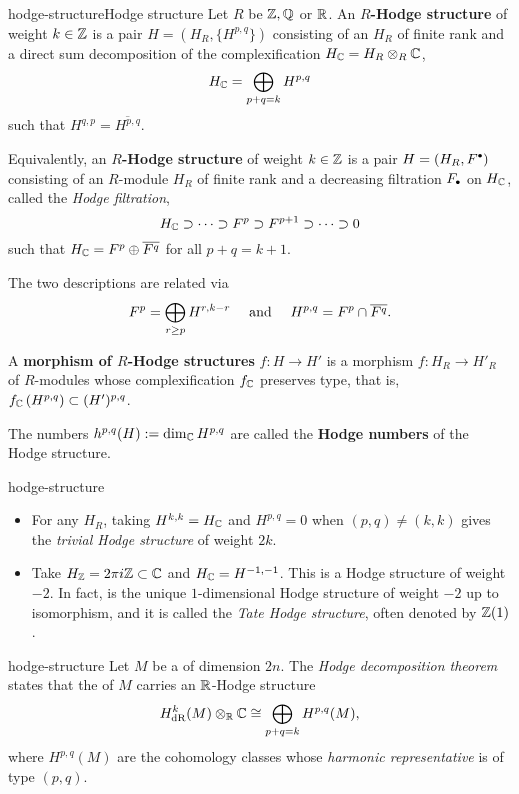 \begin{topic}{hodge-structure}{Hodge structure}
    Let $R$ be $\mathbb{Z}, \mathbb{Q}$ or $\mathbb{R}$. An \textbf{$R$-Hodge structure} of weight $k \in \mathbb{Z}$ is a pair $H = (H_R, \{ H^{p, q} \})$ consisting of an  $H_R$ of finite rank and a direct sum decomposition of the complexification $H_{\mathbb{C}} = H_R \otimes_R \mathbb{C}$,
    \[ H_{\mathbb{C}} = \bigoplus_{p + q = k} H^{p, q} \]
    such that $H^{q, p} = \overline{H^{p, q}}$.

    Equivalently, an \textbf{$R$-Hodge structure} of weight $k \in \mathbb{Z}$ is a pair $H = (H_R, F^\bdot)$ consisting of an $R$-module $H_R$ of finite rank and a decreasing filtration $F_\bdot$ on $H_{\mathbb{C}}$, called the \textit{Hodge filtration},
    \[ H_{\mathbb{C}} \supset \cdots \supset F^p \supset F^{p + 1} \supset \cdots \supset 0 \]
    such that $H_{\mathbb{C}} = F^p \oplus \overline{F^q}$ for all $p + q = k + 1$.

    The two descriptions are related via
    \[ F^p = \bigoplus_{r \ge p} H^{r, k - r} \quad \textup{ and } \quad H^{p, q} = F^p \cap \overline{F^q} . \]

    A \textbf{morphism of $R$-Hodge structures} $f \colon H \to H'$ is a morphism $f \colon H_R \to H'_R$ of $R$-modules whose complexification $f_{\mathbb{C}}$ preserves type, that is, $f_{\mathbb{C}}\left(H^{p, q}\right) \subset (H')^{p, q}$.
    
    The numbers $h^{p, q}(H) := \dim_{\mathbb{C}} H^{p, q}$ are called the \textbf{Hodge numbers} of the Hodge structure.
\end{topic}

\begin{example}{hodge-structure}
    \begin{itemize}
        \item For any $H_R$, taking $H^{k, k} = H_{\mathbb{C}}$ and $H^{p, q} = 0$ when $(p, q) \ne (k, k)$ gives the \textit{trivial Hodge structure} of weight $2k$.
        \item Take $H_{\mathbb{Z}} = 2 \pi i \mathbb{Z} \subset \mathbb{C}$ and $H_{\mathbb{C}} = H^{-1, -1}$. This is a Hodge structure of weight $-2$. In fact, is the unique $1$-dimensional Hodge structure of weight $-2$ up to isomorphism, and it is called the \textit{Tate Hodge structure}, often denoted by $\mathbb{Z}(1)$.
    \end{itemize}
\end{example}

\begin{example}{hodge-structure}
    Let $M$ be a   of dimension $2n$. The \textit{Hodge decomposition theorem} states that the  of $M$ carries an $\mathbb{R}$-Hodge structure
    \[ H_\textup{dR}^k(M) \otimes_{\mathbb{R}} \mathbb{C} \cong \bigoplus_{p + q = k} H^{p, q}(M) , \]
    where $H^{p, q}(M)$ are the cohomology classes whose \textit{harmonic representative} is of type $(p, q)$.
\end{example}

